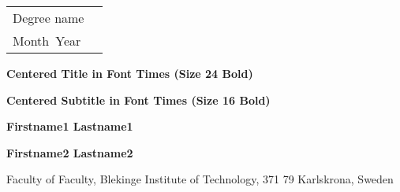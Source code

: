 \documentclass[a4paper,twoside]{bth}
\newcommand{\thesisDegree}{Degree name}
\newcommand{\thesisMonth}{Month}
\newcommand{\thesisYear}{Year}
\newcommand{\faculty}{Faculty}
\newcommand{\thesisTitle}{Centered Title in Font Times (Size 24 Bold)}
\newcommand{\thesisSubtitle}{Centered Subtitle in Font Times (Size 16 Bold)}
\newcommand{\authorFirst}{Firstname1 Lastname1}
\newcommand{\authorSecond}{Firstname2 Lastname2}
\begin{document}
\pagestyle{plain}

{\pagestyle{empty}
\changepage{3cm}{1cm}{-0.5cm}{-0.5cm}{}{-1.5cm}{}{}{}
\noindent
\begin{tabular}{@{}p{} p{}}
\thesisDegree & \hfill\multirow{3}{*}{\bthcsnotextlogo{3cm}} \\
\thesisMonth \ \thesisYear & \\
\end{tabular}

\center
\vspace {7.5cm}
{\Huge\textbf{\thesisTitle}}

\vspace {0.5cm}
{\Large\textbf{\thesisSubtitle}}

\vspace{2cm}
{\Large\textbf{\authorFirst}}

\vspace{0.3cm}
{\Large\textbf{\authorSecond}}

\vspace*{\fill}

\noindent\makebox[\linewidth]{\rule{\textwidth}{1pt}} 
Faculty of \faculty, Blekinge Institute of Technology, 371 79 Karlskrona, Sweden

\clearpage
} %
\end{document}
